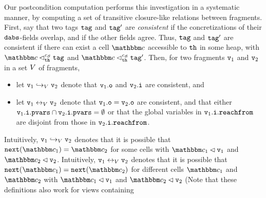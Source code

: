 Our postcondition computation performs this investigation in a
systematic manner, by computing a set of transitive closure-like relations
between fragments.
First, say that two tags
$\mathtt{tag}$ and $\mathtt{tag}'$ are {\em consistent} if the concretizations of their
$\mathtt{dabs}$-fields overlap, and if the other fields agree.
Thus, $\mathtt{tag}$ and $\mathtt{tag}'$ are consistent if there can exist a cell
$\cell$ accessible to ${\tt th}$ in some heap,
with $\cell \satfrag{\thread}{\sconf} \atag$
and $\cell \satfrag{\thread}{\sconf} \atag'$.
Then, for two fragments $\mathtt{v}_1$ and $\mathtt{v}_2$ in a set $V$ of fragments,
\begin{itemize}
\item let $\mathtt{v}_1 \hookrightarrow_{V} \mathtt{v}_2$ denote that $\mathtt{v}_1.\mathtt{o}$   and $\mathtt{v}_2.\mathtt{i}$ are consistent, and
\item let $\mathtt{v}_1 \leftrightarrow_{V} \mathtt{v}_2$ denote that $\mathtt{v}_1.\mathtt{o} = \mathtt{v}_2.\mathtt{o}$ are consistent, and that either
  $\mathtt{v}_1.\mathtt{i}.\mathtt{pvars} \cap \mathtt{v}_2.\mathtt{i}.\mathtt{pvars} = \emptyset$ or that
  the global variables in  $\mathtt{v}_1.\mathtt{i}.\mathtt{reachfrom}$ are disjoint from
  those in $\mathtt{v}_2.\mathtt{i}.\mathtt{reachfrom}$.
\end{itemize}
Intuitively, $\mathtt{v}_1 \hookrightarrow_{V} \mathtt{v}_2$ denotes that it is
possible that  $\mathtt{next}(\cell_1) = \cell_2$ for some cells with
  $\cell_1 \lhd \frag_1$ and  $\cell_2 \lhd \frag_2$.
Intuitively, $\mathtt{v}_1 \leftrightarrow_{V} \mathtt{v}_2$ denotes that it is
possible that
  $\mathtt{next}(\cell_1) = \mathtt{next}(\cell_2)$
for different cells  $\cell_1$ and $\cell_2$ with
  $\cell_1 \lhd \frag_1$ and  $\cell_2 \lhd \frag_2$
(Note that these definitions also work for views containing
